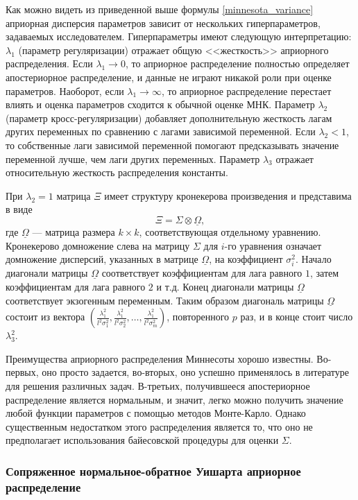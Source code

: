 \documentclass[11pt]{article} %
\begin{document}
Как можно видеть из приведенной выше формулы \eqref{minnesota_variance} априорная дисперсия параметров зависит от нескольких гиперпараметров, задаваемых исследователем. Гиперпараметры имеют следующую интерпретацию: $\lambda_1$ (параметр регуляризации) отражает общую <<жесткость>> априорного распределения. Если $\lambda_1\to 0$, то априорное распределение полностью определяет апостериорное распределение, и данные не играют никакой роли при оценке параметров. Наоборот, если $\lambda_1\to \infty$, то априорное распределение перестает влиять и оценка параметров сходится к обычной оценке МНК. Параметр $\lambda_2$ (параметр кросс-регуляризации) добавляет дополнительную жесткость лагам других переменных по сравнению с лагами зависимой переменной. Если  $\lambda_2<1$, то собственные лаги зависимой переменной помогают предсказывать значение переменной лучше, чем лаги других переменных. Параметр $\lambda_3$ отражает относительную жесткость распределения константы.

При $\lambda_2=1$ матрица $\Xi$ имеет структуру кронекерова произведения и представима в виде
\[
\Xi = \Sigma \otimes \underline{\Omega},
\]
где $\underline{\Omega}$ --- матрица размера $k\times k$, соответствующая отдельному уравнению. Кронекерово домножение слева на матрицу $\Sigma$ для $i$-го уравнения означает домножение дисперсий, указанных в матрице $\underline{\Omega}$, на коэффициент $\sigma^2_i$.  Начало диагонали матрицы $\underline{\Omega}$ соответствует коэффициентам для лага равного $1$, затем коэффициентам  для лага равного $2$ и т.д. Конец диагонали матрицы $\underline{\Omega}$ соответствует экзогенным переменным. Таким образом диагональ матрицы $\underline{\Omega}$ состоит из вектора $\left(\frac{\lambda_1^2}{l^2 \sigma_1^2}, \frac{\lambda_1^2}{l^2 \sigma_2^2}, \ldots, \frac{\lambda_1^2}{l^2 \sigma_m^2}   \right)$, повторенного $p$ раз, и в конце стоит число $\lambda_3^2$.


Преимущества априорного распределения Миннесоты хорошо известны. Во-первых, оно просто задается, во-вторых, оно успешно применялось в литературе для решения различных задач. В-третьих, получившееся апостериорное распределение является нормальным, и значит, легко можно получить значение любой функции параметров с помощью методов Монте-Карло. Однако существенным недостатком этого распределения является то, что оно не предполагает использования байесовской процедуры для оценки $\Sigma$.

\subsubsection{Сопряженное нормальное-обратное Уишарта априорное распределение}
\end{document}
